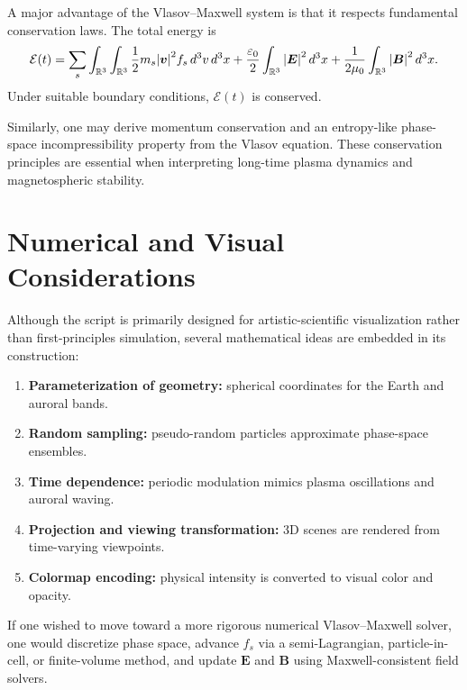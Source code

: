 \documentclass[11pt]{article}
\begin{document}
A major advantage of the Vlasov--Maxwell system is that it respects fundamental conservation laws. The total energy is
\begin{equation}
\mathcal{E}(t)
=
\sum_s \int_{\mathbb{R}^3}\int_{\mathbb{R}^3}
\frac{1}{2}m_s \abs{\bm{v}}^2 f_s\,d^3v\,d^3x
+
\frac{\varepsilon_0}{2}\int_{\mathbb{R}^3}\abs{\bm{E}}^2\,d^3x
+
\frac{1}{2\mu_0}\int_{\mathbb{R}^3}\abs{\bm{B}}^2\,d^3x.
\end{equation}
Under suitable boundary conditions, \(\mathcal{E}(t)\) is conserved.

Similarly, one may derive momentum conservation and an entropy-like phase-space incompressibility property from the Vlasov equation. These conservation principles are essential when interpreting long-time plasma dynamics and magnetospheric stability.

\section{Numerical and Visual Considerations}

Although the script is primarily designed for artistic-scientific visualization rather than first-principles simulation, several mathematical ideas are embedded in its construction:
\begin{enumerate}[label=(\arabic*)]
    \item \textbf{Parameterization of geometry:} spherical coordinates for the Earth and auroral bands.
    \item \textbf{Random sampling:} pseudo-random particles approximate phase-space ensembles.
    \item \textbf{Time dependence:} periodic modulation mimics plasma oscillations and auroral waving.
    \item \textbf{Projection and viewing transformation:} 3D scenes are rendered from time-varying viewpoints.
    \item \textbf{Colormap encoding:} physical intensity is converted to visual color and opacity.
\end{enumerate}

If one wished to move toward a more rigorous numerical Vlasov--Maxwell solver, one would discretize phase space, advance \(f_s\) via a semi-Lagrangian, particle-in-cell, or finite-volume method, and update \(\bm{E}\) and \(\bm{B}\) using Maxwell-consistent field solvers.

\end{document}
